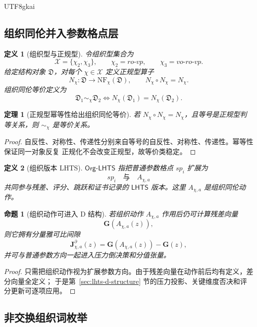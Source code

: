 \documentclass[12pt]{article}
\newtheorem{definition}{定义}[section]
\newtheorem{theorem}{定理}[section]
\newtheorem{proposition}{命题}[section]
\newcommand{\LHTS}{\ensuremath{\mathsf{LHTS}}}
\newcommand{\OrgLHTS}{\ensuremath{\mathsf{Org\mbox{-}LHTS}}}
\newcommand{\Chi}{\mathcal X}
\begin{document}
\begin{CJK*}{UTF8}{gkai}
\subsection{组织同伦并入参数格点层}
\label{subsec:lhts-org-layer}

\begin{definition}[组织型与正规型]
令组织型集合为
\[
  \Chi=\{\chi_2,\chi_3\},
  \qquad
  \chi_2=ro\mbox{-}vp,
  \qquad
  \chi_3=vo\mbox{-}ro\mbox{-}vp .
\]
给定结构对象 \(\mathfrak D\)，对每个 \(\chi\in\Chi\) 定义正规型算子
\[
  N_\chi:\mathfrak D\to \mathrm{NF}_{\chi}(\mathfrak D),
  \qquad
  N_\chi\circ N_\chi=N_\chi .
\]
组织同伦等价定义为
\[
  \mathfrak D_1\sim_\chi\mathfrak D_2
  \Longleftrightarrow
  N_\chi(\mathfrak D_1)=N_\chi(\mathfrak D_2).
\]
\end{definition}

\begin{theorem}[正规型幂等性给出组织同伦等价]
\label{thm:lhts-normal-form-equivalence}
若 \(N_\chi\circ N_\chi=N_\chi\)，且等号是正规型判等关系，则 \(\sim_\chi\)
是等价关系。
\end{theorem}

\begin{proof}
自反性、对称性、传递性分别来自等号的自反性、对称性、传递性。幂等性保证同一对象反复
正规化不会改变正规型，故等价类稳定。
\end{proof}

\begin{definition}[组织版本 LHTS]
\OrgLHTS{} 指把普通参数格点 \(sp_i\) 扩展为
\[
  sp_i
  \quad\text{与}\quad
  A_{\chi,a}
\]
共同参与残差、评分、跳跃和证书记录的 \LHTS{} 版本。这里 \(A_{\chi,a}\) 是组织同伦动作。
\end{definition}

\begin{proposition}[组织动作可进入 D 结构]
若组织动作 \(A_{\chi,a}\) 作用后仍可计算残差向量
\[
  \mathbf G(A_{\chi,a}(z)),
\]
则它拥有分量雅可比间隙
\[
  \mathbf J_{\chi,a}^{\partial}(z)
  =
  \mathbf G(A_{\chi,a}(z))-\mathbf G(z),
\]
并可与普通参数方向一起进入压力倒决策和分值张量。
\end{proposition}

\begin{proof}
只需把组织动作视为扩展参数方向。由于残差向量在动作前后均有定义，差分向量全定义；
于是第~\ref{sec:lhts-d-structure} 节的压力投影、关键维度否决和评分更新可逐项应用。
\end{proof}

\subsection{非交换组织词枚举}
\label{subsec:lhts-nc-word}


\end{CJK*}
\end{document}
